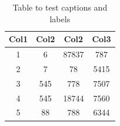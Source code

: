 \documentclass[12pt, letterpaper]{article}
\begin{document}
\begin{table}[h!]
    \centering
    \begin{tabular}{||c c c c||}
        \hline
        Col1 & Col2 & Col2 & Col3 \\ [0.5ex]
        \hline\hline
        1 & 6 & 87837 & 787 \\
        2 & 7 & 78 & 5415 \\
        3 & 545 & 778 & 7507 \\
        4 & 545 & 18744 & 7560 \\
        5 & 88 & 788 & 6344 \\ [1ex]
        \hline
    \end{tabular}
    \caption{Table to test captions and labels}
    \label{table:data}
\end{table}
\end{document}
